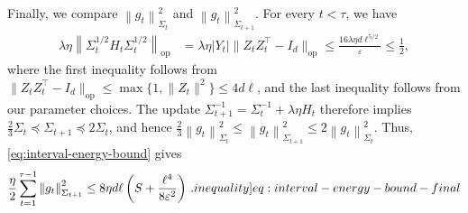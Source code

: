 \documentclass[12pt,cleveref]{jmlr}
\newcommand{\ineqlabel}[1]{\label[inequality]{#1}}
\newcommand{\op}{\mathrm{op}}
\newcommand{\1}{\mathbf 1}
\newcommand{\eps}{\varepsilon}
\newcommand{\normm}[2]{\left\lVert #1\right\rVert_{#2}}
\begin{document}
Finally, we compare $\normm{g_t}{\Sigma_t}^2$ and $\normm{g_t}{\Sigma_{t+1}}^2$.
For every $t<\tau$, we have
\begin{align}
    \lambda\eta\left\|
    \Sigma_t^{1/2}H_t\Sigma_t^{1/2}
    \right\|_{\op}
    & =\lambda\eta|Y_t|\|Z_tZ_t^\top-I_d\|_{\op}
    \leq\frac{16\lambda\eta d\ell^{5/2}}{\eps}
    \leq\frac12,
\end{align}
where the first inequality follows from
$\|Z_tZ_t^\top-I_d\|_{\op} \leq \max\{1,\|Z_t\|^2\} \leq 4d\ell$,
and the last inequality follows from our parameter choices.
The update $\Sigma_{t+1}^{-1}
=\Sigma_t^{-1}+\lambda\eta H_t$ therefore implies
$\frac23\Sigma_t
\preceq\Sigma_{t+1}
\preceq2\Sigma_t$,
and hence
$
\frac23\normm{g_t}{\Sigma_t}^2
\leq\normm{g_t}{\Sigma_{t+1}}^2
\leq2\normm{g_t}{\Sigma_t}^2
$.
Thus, \cref{eq:interval-energy-bound} gives
\begin{align}
    \frac{\eta}{2}\sum_{t=1}^{\tau-1}\normm{g_t}{\Sigma_{t+1}}^2
    \leq
    8\eta d\ell
    \left(
        S + \frac{\ell^4}{8\eps^2}
    \right)\,.
    \ineqlabel{eq:interval-energy-bound-final}
\end{align}
\end{document}
